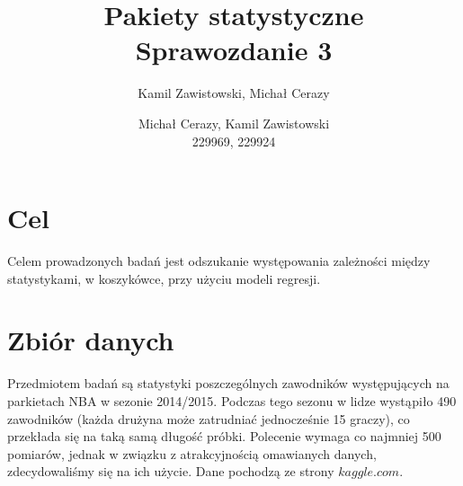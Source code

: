 \documentclass[11pt,a4paper]{article}
\author{Kamil Zawistowski, Michał Cerazy}
\begin{document}
\title{Pakiety statystyczne \\ Sprawozdanie 3}
\author{Michał Cerazy, Kamil Zawistowski \\ 229969, 229924}
\maketitle
\newpage
\tableofcontents
\newpage
\section{Cel}
Celem prowadzonych badań jest odszukanie występowania zależności między statystykami, w koszykówce, przy użyciu modeli regresji. 

\section{Zbiór danych}
Przedmiotem badań są statystyki poszczególnych zawodników występujących na parkietach NBA w sezonie 2014/2015. Podczas tego sezonu w lidze wystąpiło 490 zawodników (każda drużyna może zatrudniać jednocześnie 15 graczy), co przekłada się na taką samą długość próbki. Polecenie wymaga co najmniej 500 pomiarów, jednak w związku z atrakcyjnością omawianych danych, zdecydowaliśmy się na ich użycie. Dane pochodzą ze strony $kaggle.com$. 
\end{document}
